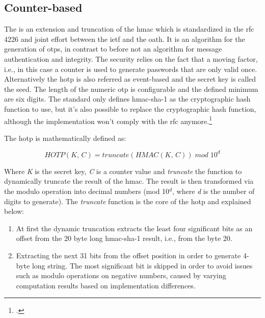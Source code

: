 \subsection{Counter-based}
\label{subsec:hotp}

The  is an extension and truncation of the \gls{hmac} which is standardized in the \gls{rfc} 4226 and joint effort between the \gls{ietf} and the \gls{oath}. It is an algorithm for the generation of \glspl{otp}, in contrast to before not an algorithm for message authentication and integrity. The security relies on the fact that a \flqq moving factor\frqq{}, i.e., in this case a counter is used to generate passwords that are only valid once. Alternatively the \gls{hotp} is also referred as event-based and the secret key is called the seed. The length of the numeric \gls{otp} is configurable and the defined minimum are six digits. The standard only defines \gls{hmac}-\gls{sha}-1 as the cryptographic hash function to use, but it's also possible to replace the cryptographic hash function, although the implementation won't comply with the \gls{rfc} anymore.\footcites[See][]{m2005rfc}[See][Chapter 3]{9781849287333}

The \gls{hotp} is mathematically defined as:

\begin{equation*}
	HOTP(K,\, C) = truncate(HMAC(K,\, C))\; mod \; 10^d
\end{equation*}

Where \textit{K} is the secret key, \textit{C} is a counter value and \textit{truncate} the function to dynamically truncate the result of the \gls{hmac}. The result is then transformed via the modulo operation into decimal numbers 	(mod 10$^d$, where \textit{d} is the number of digits to generate). The \textit{truncate} function is the core of the \gls{hotp} and explained below:

\begin{enumerate}
	\item At first the dynamic truncation extracts the least four significant bits as an offset from the 20 byte long \gls{hmac}-\gls{sha}-1 result, i.e., from the byte 20.
	\item Extracting the next 31 bits from the offset position in order to generate 4-byte long string. The most significant bit is skipped in order to avoid issues such as modulo operations on negative numbers, caused by varying computation results based on implementation differences.
\end{enumerate}

